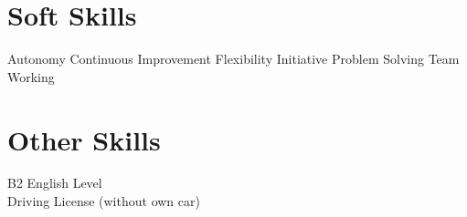 \documentclass[]{deedy-resume-openfont}
\begin{document}
\begin{minipage}[t]{0.33\textwidth}
\section{Soft Skills}
Autonomy \textbullet{} Continuous Improvement \textbullet{} Flexibility \textbullet{}
Initiative \textbullet{} Problem Solving \textbullet{} Team Working
\sectionsep
\section{Other Skills}
B2 English Level \\
Driving License (without own car)
\sectionsep

%
%

\end{minipage} 
\vline
\hspace{0.01\textwidth}
\end{document}
